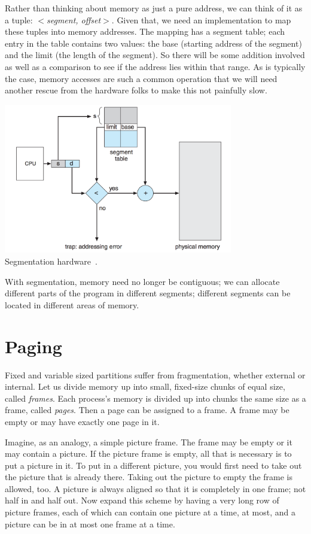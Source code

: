 Rather than thinking about memory as just a pure address, we can think of it as a tuple: \textit{$<$segment, offset$>$}. Given that, we need an implementation to map these tuples into memory addresses. The mapping has a segment table; each entry in the table contains two values: the base (starting address of the segment) and the limit (the length of the segment). So there will be some addition involved as well as a comparison to see if the address lies within that range. As is typically the case, memory accesses are such a common operation that we will need another rescue from the hardware folks to make this not painfully slow.

\begin{center}
\includegraphics[width=0.75\textwidth]{images/segmentation-hardware.png}\\
Segmentation hardware~\cite{osc}.
\end{center}

With segmentation, memory need no longer be contiguous; we can allocate different parts of the program in different segments; different segments can be located in different areas of memory.

\section*{Paging}
Fixed and variable sized partitions suffer from fragmentation, whether external or internal. Let us divide memory up into small, fixed-size chunks of equal size, called \textit{frames}. Each process's memory is divided up into chunks the same size as a frame, called \textit{pages}. Then a page can be assigned to a frame. A frame may be empty or may have exactly one page in it. 

Imagine, as an analogy, a simple picture frame. The frame may be empty or it may contain a picture. If the picture frame is empty, all that is necessary is to put a picture in it. To put in a different picture, you would first need to take out the picture that is already there. Taking out the picture to empty the frame is allowed, too. A picture is always aligned so that it is completely in one frame; not half in and half out. Now expand this scheme by having a very long row of picture frames, each of which can contain one picture at a time, at most, and a picture can be in at most one frame at a time. 

